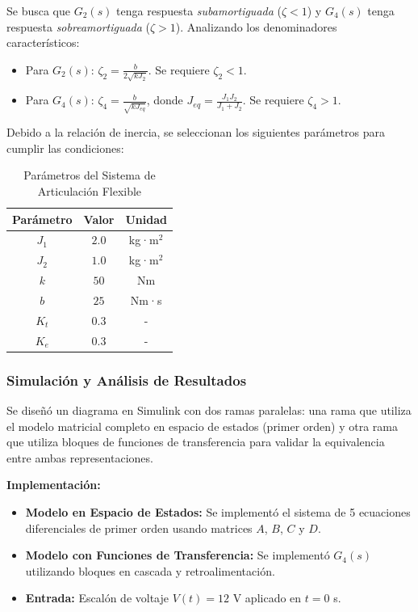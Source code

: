 \documentclass[conference]{IEEEtran}
\begin{document}
Se busca que $G_2(s)$ tenga respuesta \emph{subamortiguada} ($\zeta < 1$) y $G_4(s)$ tenga respuesta \emph{sobreamortiguada} ($\zeta > 1$). Analizando los denominadores característicos:

\begin{itemize}
\item Para $G_2(s)$: $\zeta_2 = \frac{b}{2\sqrt{kJ_2}}$. Se requiere $\zeta_2 < 1$.
\item Para $G_4(s)$: $\zeta_4 = \frac{b}{\sqrt{kJ_{eq}}}$, donde $J_{eq} = \frac{J_1J_2}{J_1+J_2}$. Se requiere $\zeta_4 > 1$.
\end{itemize}

Debido a la relación de inercia, se seleccionan los siguientes parámetros para cumplir las condiciones:

\begin{table}[htbp]
\centering
\caption{Parámetros del Sistema de Articulación Flexible}
\begin{tabular}{ccc}
\toprule
\textbf{Parámetro} & \textbf{Valor} & \textbf{Unidad} \\
\midrule
$J_1$ & $2.0$ & kg·m$^2$ \\
$J_2$ & $1.0$ & kg·m$^2$ \\
$k$ & $50$ & Nm \\
$b$ & $25$ & Nm·s \\
$K_t$ & $0.3$ & - \\
$K_e$ & $0.3$ & - \\
\bottomrule
\end{tabular}
\end{table}

\subsubsection{Simulación y Análisis de Resultados}

Se diseñó un diagrama en Simulink con dos ramas paralelas: una rama que utiliza el modelo matricial completo en espacio de estados (primer orden) y otra rama que utiliza bloques de funciones de transferencia para validar la equivalencia entre ambas representaciones.

\textbf{Implementación:}
\begin{itemize}
\item \textbf{Modelo en Espacio de Estados:} Se implementó el sistema de 5 ecuaciones diferenciales de primer orden usando matrices $A$, $B$, $C$ y $D$.
\item \textbf{Modelo con Funciones de Transferencia:} Se implementó $G_4(s)$ utilizando bloques en cascada y retroalimentación.
\item \textbf{Entrada:} Escalón de voltaje $V(t) = 12$ V aplicado en $t = 0$ s.
\end{itemize}
\end{document}
